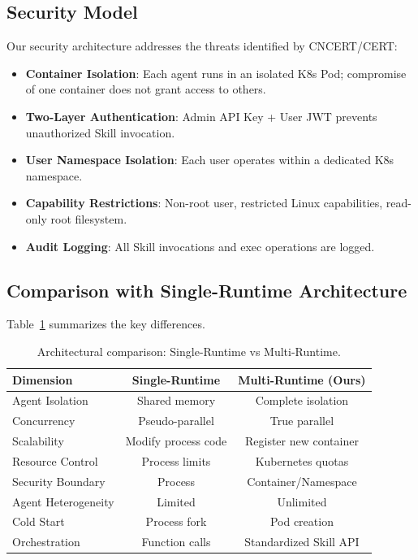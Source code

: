 \subsection{Security Model}

Our security architecture addresses the threats identified by CNCERT/CERT:

\begin{itemize}
    \item \textbf{Container Isolation}: Each agent runs in an isolated K8s Pod; compromise of one container does not grant access to others.
    \item \textbf{Two-Layer Authentication}: Admin API Key + User JWT prevents unauthorized Skill invocation.
    \item \textbf{User Namespace Isolation}: Each user operates within a dedicated K8s namespace.
    \item \textbf{Capability Restrictions}: Non-root user, restricted Linux capabilities, read-only root filesystem.
    \item \textbf{Audit Logging}: All Skill invocations and exec operations are logged.
\end{itemize}

\subsection{Comparison with Single-Runtime Architecture}

Table~\ref{tab:comparison} summarizes the key differences.

\begin{table}[htbp]
    \centering
    \caption{Architectural comparison: Single-Runtime vs Multi-Runtime.}
    \label{tab:comparison}
    \begin{tabular}{@{}lcc@{}}
        \toprule
        \textbf{Dimension} & \textbf{Single-Runtime} & \textbf{Multi-Runtime (Ours)} \\
        \midrule
        Agent Isolation & Shared memory & Complete isolation \\
        Concurrency & Pseudo-parallel & True parallel \\
        Scalability & Modify process code & Register new container \\
        Resource Control & Process limits & Kubernetes quotas \\
        Security Boundary & Process & Container/Namespace \\
        Agent Heterogeneity & Limited & Unlimited \\
        Cold Start & Process fork & Pod creation \\
        Orchestration & Function calls & Standardized Skill API \\
        \bottomrule
    \end{tabular}
\end{table}
